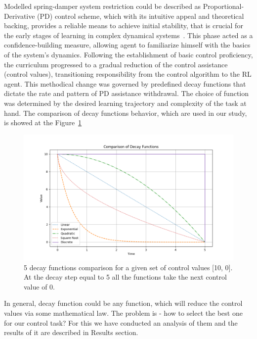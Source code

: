 Modelled spring-damper system restriction could be described as Proportional-Derivative (PD) control scheme, which with its intuitive appeal and theoretical backing, provides a reliable means to achieve initial stability, that is crucial for the early stages of learning in complex dynamical systems~\cite{franklin2010feedback}. This phase acted as a confidence-building measure, allowing agent to familiarize himself with the basics of the system’s dynamics.
Following the establishment of basic control proficiency, the curriculum progressed to a gradual reduction of the control assistance (control values), transitioning responsibility from the control algorithm to the RL agent. This methodical change was governed by predefined decay functions that dictate the rate and pattern of PD assistance withdrawal. The choice of function was determined by the desired learning trajectory and complexity of the task at hand. The comparison of decay functions behavior, which are used in our study, is showed at the Figure~\ref{fig: decay types}
\begin{figure}[h]
\centering
\includegraphics[width=15cm]{Figures/CL_decay_types_comparison.png}
\caption{5 decay functions comparison for a given set of control values [10, 0]. At the decay step equal to 5 all the functions take the next control value of 0.}
\label{fig: decay types}
\end{figure}
In general, decay function could be any function, which will reduce the control values via some mathematical law. The problem is - how to select the best one for our control task? For this we have conducted an analysis of them and the results of it are described in Results section. 


